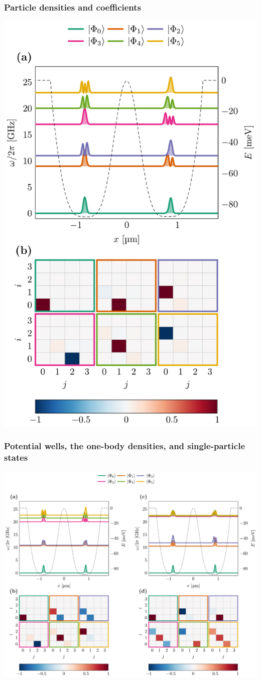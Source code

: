 \documentclass{beamer}
\begin{document}
\begin{frame}
\frametitle{Particle densities and coefficients}

\vspace{6mm}

\centerline{\includegraphics[width=0.7\linewidth]{qcfigures/configuration_I-1.png}}

\vspace{6mm}
\end{frame}

\begin{frame}
\frametitle{Potential wells, the one-body densities, and single-particle states}

\vspace{6mm}

\centerline{\includegraphics[width=0.7\linewidth]{qcfigures/configuration_II_and_III-1.png}}

\vspace{6mm}
\end{frame}
\end{document}

